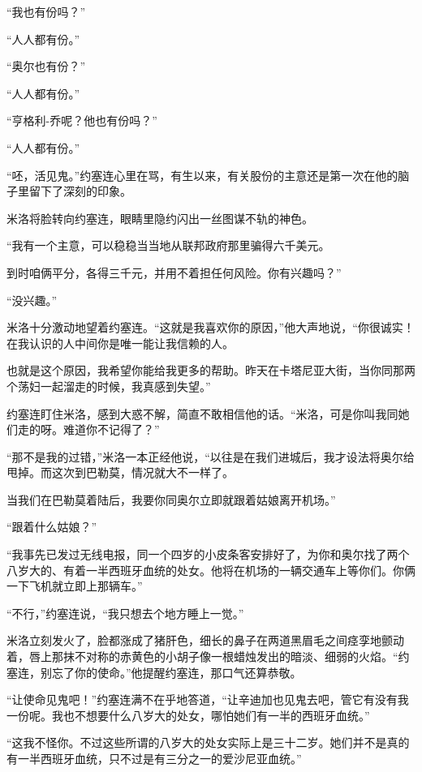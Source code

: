     “我也有份吗？”

    “人人都有份。”

    “奥尔也有份？”

    “人人都有份。”

    “亨格利-乔呢？他也有份吗？”

    “人人都有份。”

    “呸，活见鬼。”约塞连心里在骂，有生以来，有关股份的主意还是第一次在他的脑子里留下了深刻的印象。

    米洛将脸转向约塞连，眼睛里隐约闪出一丝图谋不轨的神色。

    “我有一个主意，可以稳稳当当地从联邦政府那里骗得六千美元。

    到时咱俩平分，各得三千元，并用不着担任何风险。你有兴趣吗？”

    “没兴趣。”

    米洛十分激动地望着约塞连。“这就是我喜欢你的原因，”他大声地说，“你很诚实！在我认识的人中间你是唯一能让我信赖的人。

    也就是这个原因，我希望你能给我更多的帮助。昨天在卡塔尼亚大街，当你同那两个荡妇一起溜走的时候，我真感到失望。”

    约塞连盯住米洛，感到大惑不解，简直不敢相信他的话。“米洛，可是你叫我同她们走的呀。难道你不记得了？”

    “那不是我的过错，”米洛一本正经他说，“以往是在我们进城后，我才设法将奥尔给甩掉。而这次到巴勒莫，情况就大不一样了。

    当我们在巴勒莫着陆后，我要你同奥尔立即就跟着姑娘离开机场。”

    “跟着什么姑娘？”

    “我事先已发过无线电报，同一个四岁的小皮条客安排好了，为你和奥尔找了两个八岁大的、有着一半西班牙血统的处女。他将在机场的一辆交通车上等你们。你俩一下飞机就立即上那辆车。”

    “不行，”约塞连说，“我只想去个地方睡上一觉。”

    米洛立刻发火了，脸都涨成了猪肝色，细长的鼻子在两道黑眉毛之间痉孪地颤动着，唇上那抹不对称的赤黄色的小胡子像一根蜡烛发出的暗淡、细弱的火焰。“约塞连，别忘了你的使命。”他提醒约塞连，那口气还算恭敬。

    “让使命见鬼吧！”约塞连满不在乎地答道，“让辛迪加也见鬼去吧，管它有没有我一份呢。我也不想要什么八岁大的处女，哪怕她们有一半的西班牙血统。”
 


    “这我不怪你。不过这些所谓的八岁大的处女实际上是三十二岁。她们并不是真的有一半西班牙血统，只不过是有三分之一的爱沙尼亚血统。”


